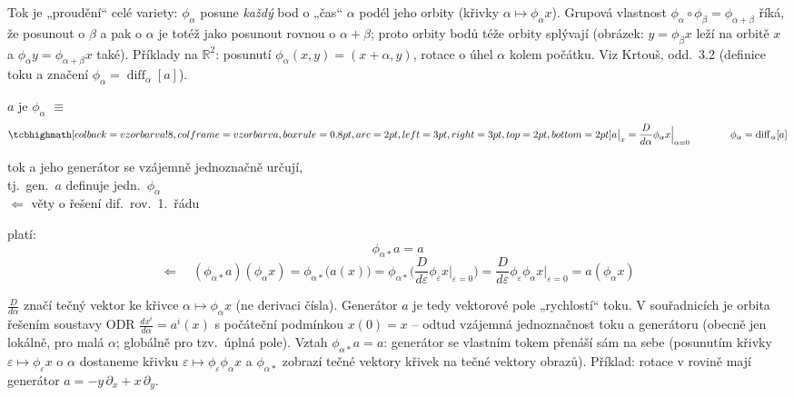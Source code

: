 \begin{vysvetleni}[co je tok]
Tok je „proudění“ celé variety: $\phi_\alpha$ posune \emph{každý} bod o „čas“ $\alpha$ podél jeho orbity (křivky $\alpha\mapsto\phi_\alpha x$).
Grupová vlastnost $\phi_\alpha\circ\phi_\beta=\phi_{\alpha+\beta}$ říká, že posunout o $\beta$ a pak o $\alpha$ je totéž jako posunout rovnou o $\alpha+\beta$; proto orbity bodů téže orbity splývají (obrázek: $y=\phi_\beta x$ leží na orbitě $x$ a $\phi_\alpha y=\phi_{\alpha+\beta}x$ také).
Příklady na $\mathbb{R}^2$: posunutí $\phi_\alpha(x,y)=(x+\alpha,y)$, rotace o úhel $\alpha$ kolem počátku.
Viz Krtouš, odd.~3.2 (definice toku a značení $\phi_\alpha=\operatorname{diff}_\alpha[a]$).
\end{vysvetleni}

\begin{definice}
$a$ je  $\phi_\alpha$ \quad $\equiv$
\[
  \vzorec{a\big|_x = \frac{D}{d\alpha}\phi_\alpha x\Big|_{\alpha=0}}
  \qquad\qquad \phi_\alpha = \operatorname{diff}_\alpha[a]
\]
\end{definice}

\begin{veta}[Tvrzení]
tok a jeho generátor se vzájemně jednoznačně určují, \\
tj.\ gen.\ $a$ definuje jedn.\ $\phi_\alpha$ \\
$\Leftarrow$ věty o řešení dif.\ rov.\ 1.\ řádu
\end{veta}

platí:
\[
  \phi_{\alpha*}a = a
\]
\[
  \Leftarrow\quad (\phi_{\alpha*}a)(\phi_\alpha x) = \phi_{\alpha*}\big(a(x)\big)
  = \phi_{\alpha*}\Big(\frac{D}{d\varepsilon}\phi_\varepsilon x\Big|_{\varepsilon=0}\Big)
  = \frac{D}{d\varepsilon}\phi_\varepsilon\phi_\alpha x\Big|_{\varepsilon=0} = a(\phi_\alpha x)
\]

\begin{vysvetleni}
$\frac{D}{d\alpha}$ značí tečný vektor ke křivce $\alpha\mapsto\phi_\alpha x$ (ne derivaci čísla). Generátor $a$ je tedy vektorové pole „rychlostí“ toku.
V souřadnicích je orbita řešením soustavy ODR $\frac{dx^i}{d\alpha}=a^i(x)$ s počáteční podmínkou $x(0)=x$ -- odtud vzájemná jednoznačnost toku a generátoru (obecně jen lokálně, pro malá $\alpha$; globálně pro tzv.\ úplná pole).
Vztah $\phi_{\alpha*}a=a$: generátor se vlastním tokem přenáší sám na sebe (posunutím křivky $\varepsilon\mapsto\phi_\varepsilon x$ o $\alpha$ dostaneme křivku $\varepsilon\mapsto\phi_\varepsilon\phi_\alpha x$ a $\phi_{\alpha*}$ zobrazí tečné vektory křivek na tečné vektory obrazů).
Příklad: rotace v rovině mají generátor $a=-y\,\partial_x+x\,\partial_y$.
\end{vysvetleni}

